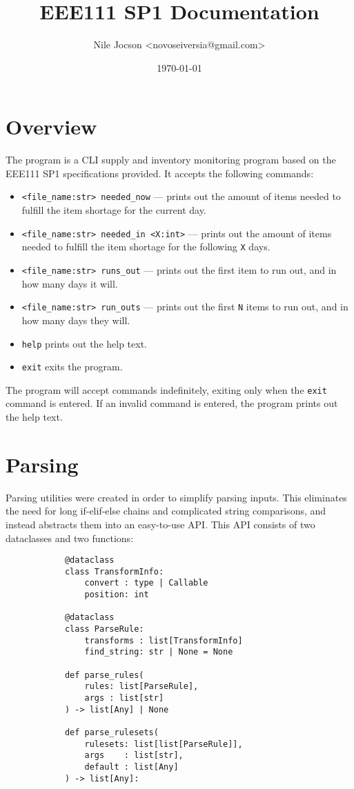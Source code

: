 \documentclass{article}
\title{EEE111 SP1 Documentation}
\author{Nile Jocson \textless{novoseiversia@gmail.com}\textgreater}
\date{\today}
\begin{document}
	\maketitle
		\pagebreak



	\tableofcontents
		\pagebreak



	\section{Overview}\label{overview}
		The program is a CLI supply and inventory monitoring program based on
		the EEE111 SP1 specifications provided. It accepts the following commands:

		\begin{itemize}
			\item \verb|<file_name:str> needed_now| --- prints out the amount of items
			needed to fulfill the item shortage for the current day.
			\item \verb|<file_name:str> needed_in <X:int>| --- prints out the amount of items
			needed to fulfill the item shortage for the following \verb|X| days.
			\item \verb|<file_name:str> runs_out| --- prints out the first item to run out, and
			in how many days it will.
			\item \verb|<file_name:str> run_outs| --- prints out the first \verb|N| items to run
			out, and in how many days they will.
			\item \verb|help| prints out the help text.
			\item \verb|exit| exits the program.
		\end{itemize}

		The program will accept commands indefinitely, exiting only when the \verb|exit| command is
		entered. If an invalid command is entered, the program prints out the help text.

		\pagebreak

	\section{Parsing}
		Parsing utilities were created in order to simplify parsing inputs. This eliminates the
		need for long if-elif-else chains and complicated string comparisons, and instead
		abstracts them into an easy-to-use API\@. This API consists of two dataclasses and
		two functions:

		\begin{verbatim}
			@dataclass
			class TransformInfo:
				convert : type | Callable
				position: int

			@dataclass
			class ParseRule:
				transforms : list[TransformInfo]
				find_string: str | None = None

			def parse_rules(
				rules: list[ParseRule],
				args : list[str]
			) -> list[Any] | None

			def parse_rulesets(
				rulesets: list[list[ParseRule]],
				args    : list[str],
				default : list[Any]
			) -> list[Any]:
		\end{verbatim}
\end{document}
